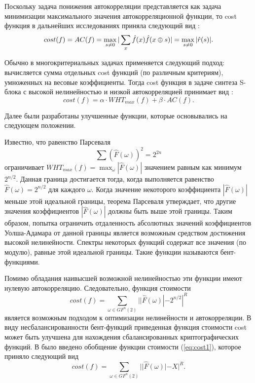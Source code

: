 Поскольку задача понижения автокорреляции представляется как задача минимизации
максимального значения автокорреляционной функции, то cost функция в дальнейших
исследованиях приняла следующий вид \cite{Clark1}:
\begin{equation}cost(f) = AC(f) = \max_{s \neq 0}|\sum_{x}\hat{f}(x)\hat{f}(x
\oplus s)|=\max_{s \neq 0}|\hat{r}(s)|.\end{equation}

Обычно в многокритериальных задачах применяется следующий подход: вычисляется
сумма отдельных cost функций (по различным критериям), умноженных на весовые
коэффициенты. Тогда cost функция в задаче синтеза S-блока с высокой
нелинейностью и низкой автокорреляцией принимает вид \cite{Clark1}:
\begin{equation}cost(f) = \alpha \cdot WHT_{max}(f) + \beta \cdot
AC(f).\end{equation}

Далее были разработаны улучшенные функции, которые основывались на следующем
положении. 

Известно, что равенство Парсеваля
\begin{equation}\sum(\hat{F}(\omega))^2 = 2^{2n}\end{equation}
ограничивает $WHT_{max}(f) = \max_{\omega}|\hat{F}(\omega)|$ значением равным
как минимум $2^{n/2}$. Данная граница достигается тогда, когда выполняется
равенство $\hat{F}(\omega) = 2^{n/2}$ для каждого $\omega$. Когда значение
некоторого коэффициента $|\hat{F}(\omega)|$ меньше этой идеальной границы,
теорема Парсеваля утверждает, что другие значения коэффициентов
$|\hat{F}(\omega)|$ должны быть выше этой границы. Таким образом, попытка
ограничить отдаленность абсолютных значений коэффициентов Уолша-Адамара от
данной границы является возможным средством достижения высокой нелинейности.
Спектры некоторых функций содержат все значения (по модулю), равные этой
идеальной границы. Такие функции называются бент-функциями. 

Помимо обладания наивысшей возможной нелинейностью эти функции имеют нулевую
автокорреляцию. Следовательно, функция стоимости
\begin{equation}\label{eq:cost1}cost(f) = \sum_{\omega \in GF^{n}(2)}||\hat{F}(\omega)| - 2^{n/2}|^R\end{equation}
является возможным подходом к оптимизации нелинейности и автокорреляции. В виду
несбалансированности бент-функций приведенная функция стоимости cost может быть
улучшена для нахождения сбалансированных криптографических функций. В \cite{Clark1} было
введено обобщение функции стоимости (\ref{eq:cost1}), которое приняло следующий вид 
\begin{equation}\label{eq:cost2}cost(f) = \sum_{\omega \in GF^{n}(2)}||\hat{F}(\omega)| - X|^R.\end{equation}

